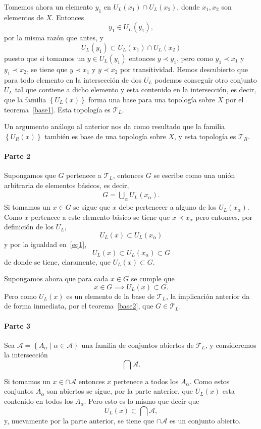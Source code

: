 \documentclass[fleqn,leqno,10pt,letterpaper,draft]{article}
\begin{document}
Tomemos ahora un elemento $y_1$ en $U_L(x_1)\cap U_L(x_2)$, donde
$x_1,x_2$ son elementos de $X$. Entonces
\[
	y_1\in U_L(y_1),
\]
por la misma razón que antes, y
\[
	U_L(y_1)\subset U_L(x_1)\cap U_L(x_2)
\]
puesto que si tomamos un $y\in U_L(y_1)$ entonces $y\prec y_1$, pero como
$y_1\prec x_1$ y $y_1\prec x_2$, se tiene que $y\prec x_1$ y $y\prec x_2$ por
transitividad. Hemos descubierto que para todo elemento en la intersección de dos $U_L$
podemos conseguir otro conjunto $U_L$ tal que contiene a dicho elemento y esta contenido en la
intersección, es decir, que la familia $\left\{ U_L(x) \right\}$ forma una base para una topología
sobre $X$ por el teorema~\ref{base1}. Esta topología es $\mathcal{T}_L$.

Un argumento análogo al anterior nos da como resultado que la familia $\left\{ U_R(x) \right\}$ también es
base de una topología sobre $X$, y esta topología es $\mathcal{T}_R$.

\paragraph{Parte 2}
Supongamos que $G$ pertenece a $\mathcal{T}_L$, entonces $G$ se escribe como una unión arbitraria
de elementos básicos, es decir, 
\begin{align}
	G = \bigcup_\alpha U_L(x_\alpha).\label{eq1}
\end{align}
Si tomamos un $x\in G$ se sigue que $x$ debe pertenecer a alguno de los $U_L(x_\alpha)$. Como $x$ pertenece
a este elemento básico se tiene que $x\prec x_\alpha$ pero entonces, por definición de los $U_L$,
\[
	U_L(x)\subset U_L(x_\alpha)
\]
y por la igualdad en~\ref{eq1},
\[
	U_L(x)\subset U_L(x_\alpha)\subset G
\]
de donde se tiene, claramente, que $U_L(x)\subset G$.

Supongamos ahora que para cada $x\in G$ se cumple que
\[
	x\in G\implies U_L(x)\subset G.
\]
Pero como $U_L(x)$ es un elemento de la base de $\mathcal{T}_L$, la implicación anterior
da de forma inmediata, por el teorema~\ref{base2}, que $G\in\mathcal{T}_L$.

\paragraph{Parte 3}%

Sea $\mathcal{A}=\left\{ A_\alpha\mid\alpha\in\mathscr{A} \right\}$ una familia de conjuntos abiertos
de $\mathcal{T}_L$, y consideremos la intersección
\[
	\bigcap\mathcal{A}.
\]

Si tomamos un $x\in\cap\mathcal{A}$ entonces $x$ pertenece a todos los $A_\alpha$. Como estos conjuntos
$A_\alpha$ son abiertos se sigue, por la parte anterior, que $U_L(x)$ esta contenido en todos
los $A_\alpha$. Pero esto es lo mismo que decir que
\[
	U_L(x)\subset\bigcap\mathcal{A},
\]
y, nuevamente por la parte anterior, se tiene que $\cap\mathcal{A}$ es un conjunto abierto. 
\end{document}
